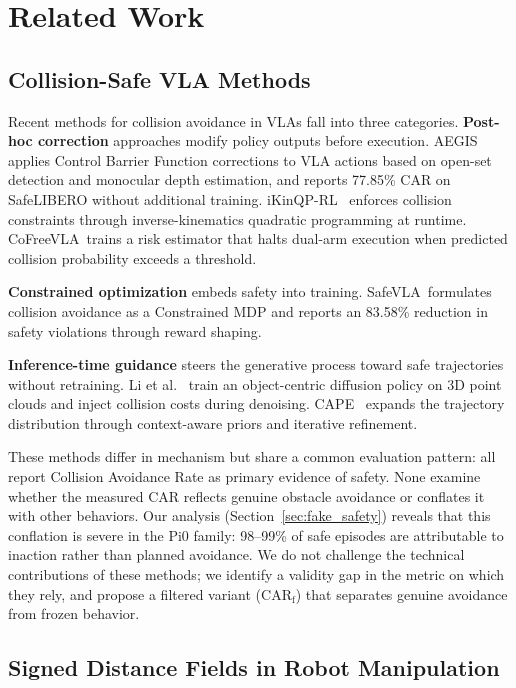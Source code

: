 \section{Related Work}\label{sec:related}

\subsection{Collision-Safe VLA Methods}\label{sec:rw_collision}

Recent methods for collision avoidance in VLAs fall into three categories. \textbf{Post-hoc correction} approaches modify policy outputs before execution. AEGIS~\cite{hu2025vlsa} applies Control Barrier Function corrections to VLA actions based on open-set detection and monocular depth estimation, and reports 77.85\% CAR on SafeLIBERO without additional training. iKinQP-RL~\cite{spalter2024ikinqp} enforces collision constraints through inverse-kinematics quadratic programming at runtime. CoFreeVLA~\cite{cofreeevla2026}trains a risk estimator that halts dual-arm execution when predicted collision probability exceeds a threshold.

\textbf{Constrained optimization} embeds safety into training. SafeVLA~\cite{zhang2025safevla}formulates collision avoidance as a Constrained MDP and reports an 83.58\% reduction in safety violations through reward shaping.

\textbf{Inference-time guidance} steers the generative process toward safe trajectories without retraining. Li et al.~\cite{li2024langguided} train an object-centric diffusion policy on 3D point clouds and inject collision costs during denoising. CAPE~\cite{yang2025cape} expands the trajectory distribution through context-aware priors and iterative refinement.

These methods differ in mechanism but share a common evaluation pattern: all report Collision Avoidance Rate as primary evidence of safety. None examine whether the measured CAR reflects genuine obstacle avoidance or conflates it with other behaviors. Our analysis (Section~\ref{sec:fake_safety}) reveals that this conflation is severe in the Pi0 family: 98--99\% of safe episodes are attributable to inaction rather than planned avoidance. We do not challenge the technical contributions of these methods; we identify a validity gap in the metric on which they rely, and propose a filtered variant (CAR$_\text{f}$) that separates genuine avoidance from frozen behavior.

\subsection{Signed Distance Fields in Robot Manipulation}\label{sec:rw_sdf}

